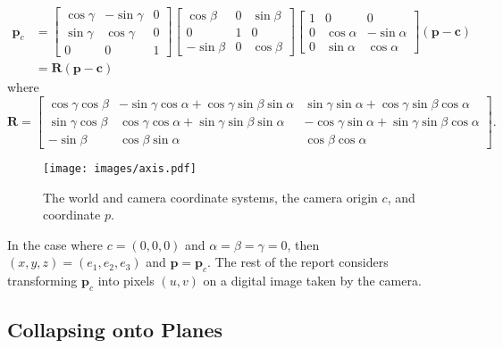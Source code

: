 \documentclass[12pt]{article}
\newcommand{\mtx}[1]{\ensuremath{\mathbf{#1}}}
\begin{document}
\begin{align}
\textbf{p}_c & = 
\begin{bmatrix}
    \cos\gamma & -\sin\gamma & 0 \\
    \sin\gamma & \cos\gamma & 0 \\
       0 & 0 & 1
\end{bmatrix}
\begin{bmatrix}
    \cos\beta & 0 & \sin\beta \\
    0 & 1 & 0 \\
   -\sin\beta & 0 & \cos\beta
\end{bmatrix}
\begin{bmatrix}
    1 & 0 & 0 \\
    0 & \cos\alpha & -\sin\alpha \\
    0 & \sin\alpha &  \cos\alpha
\end{bmatrix}
(\textbf{p}-\textbf{c})
\\ & =
\mtx{R} (\textbf{p}-\textbf{c})
\end{align}
where
\begin{equation}
\mtx{R} =
\begin{bmatrix}
\cos\gamma\cos\beta & -\sin\gamma\cos\alpha + \cos\gamma\sin\beta\sin\alpha & \sin\gamma\sin\alpha + \cos\gamma\sin\beta\cos\alpha \\
\sin\gamma\cos\beta & \cos\gamma\cos\alpha + \sin\gamma\sin\beta\sin\alpha & -\cos\gamma\sin\alpha + \sin\gamma\sin\beta\cos\alpha \\
-\sin\beta & \cos\beta\sin\alpha & \cos\beta\cos\alpha
\end{bmatrix}.
\end{equation}

\begin{figure}[h]
\centering
\texttt{[image: images/axis.pdf]}
\caption{The world and camera coordinate systems, the camera origin $c$, and coordinate $p$.}\label{fig:axis}
\end{figure}

In the case where $c = (0,0,0)$ and $\alpha = \beta = \gamma = 0$, then  $(x,y,z) = (e_1,e_2,e_3)$  and  $\textbf{p} = \textbf{p}_c$. The rest of the report considers transforming $\textbf{p}_c$ into pixels $(u,v)$ on a digital image taken by the camera.


\subsection{Collapsing onto Planes}
\end{document}
